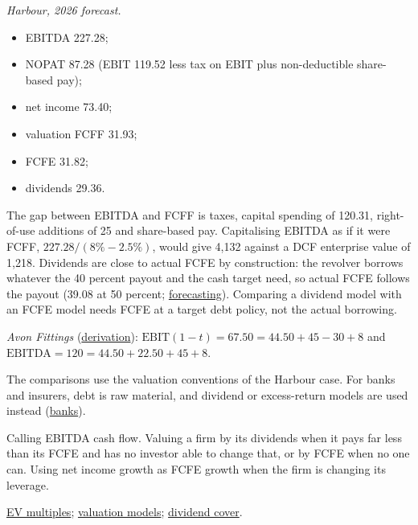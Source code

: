 \begin{qfmethod}
 \emph{Harbour, 2026 forecast.}
\begin{itemize}
\item EBITDA 227.28;
\item NOPAT 87.28 (EBIT 119.52 less tax on EBIT plus non-deductible share-based pay);
\item net income 73.40;
\item valuation FCFF 31.93;
\item FCFE 31.82;
\item dividends 29.36.
\end{itemize}
The gap between EBITDA and FCFF is taxes, capital spending of 120.31, right-of-use additions of 25 and share-based pay. Capitalising EBITDA as if it were FCFF, $227.28/(8\%-2.5\%)$, would give 4,132 against a DCF enterprise value of 1,218. Dividends are close to actual FCFE by construction: the revolver borrows whatever the 40 percent payout and the cash target need, so actual FCFE follows the payout (39.08 at 50 percent; \hyperref[meth:fcf-forecasting]{forecasting}). Comparing a dividend model with an FCFE model needs FCFE at a target debt policy, not the actual borrowing.

\emph{Avon Fittings} (\hyperref[meth:fcff-fcfe-derivation]{derivation}): $\mathrm{EBIT}(1-t)=67.50=44.50+45-30+8$ and $\mathrm{EBITDA}=120=44.50+22.50+45+8$.

 The comparisons use the valuation conventions of the Harbour case. For banks and insurers, debt is raw material, and dividend or excess-return models are used instead (\hyperref[meth:bank-camels-analysis]{banks}).

 Calling EBITDA cash flow. Valuing a firm by its dividends when it pays far less than its FCFE and has no investor able to change that, or by FCFE when no one can. Using net income growth as FCFE growth when the firm is changing its leverage.

 \hyperref[meth:enterprise-value-multiples]{EV multiples}; \hyperref[meth:fcf-valuation-models]{valuation models}; \hyperref[meth:dividend-sustainability]{dividend cover}.

\end{qfmethod}
